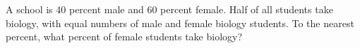 A school is 40 percent male and 60 percent female. Half of all students take biology, with equal numbers of male and female biology students. To the nearest percent, what percent of female students take biology?
